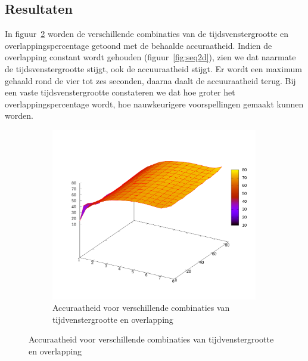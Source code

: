 \documentclass{article}
\begin{document}
\subsection{Resultaten}

In figuur~\ref{fig:3d} worden de verschillende combinaties van de tijdsvenstergrootte en overlappingspercentage getoond met de behaalde accuraatheid. Indien de overlapping constant wordt gehouden (figuur~\ref{fig:seq2d}), zien we dat naarmate de tijdsvenstergrootte stijgt, ook de accuuraatheid stijgt. Er wordt een maximum gehaald rond de vier tot zes seconden, daarna daalt de accuuraatheid terug. Bij een vaste tijdsvenstergrootte constateren we dat hoe groter het overlappingspercentage wordt, hoe nauwkeurigere voorspellingen gemaakt kunnen worden.

\begin{figure}[h]
\centering

  \begin{subfigure}[b]{.99\linewidth}
    \centering
    \includegraphics[width=0.99\textwidth]{figures/3dplot}
    \caption{Accuraatheid voor verschillende combinaties van tijdvenstergrootte en overlapping}\label{fig:3d}
  \end{subfigure}


\end{figure}
\end{document}
